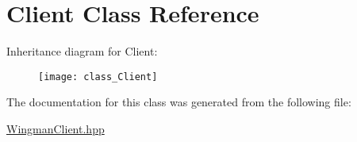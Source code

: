 \hypertarget{class_Client}{
\section{Client  Class Reference}
\label{class_Client}
}
Inheritance diagram for Client:\begin{figure}[H]
\begin{center}
\leavevmode
\texttt{[image: class\_Client]}
\end{center}
\end{figure}


The documentation for this class was generated from the following file:\begin{CompactItemize}
\item 
\hyperlink{WingmanClient_hpp-source}{Wingman\-Client.hpp}\end{CompactItemize}
